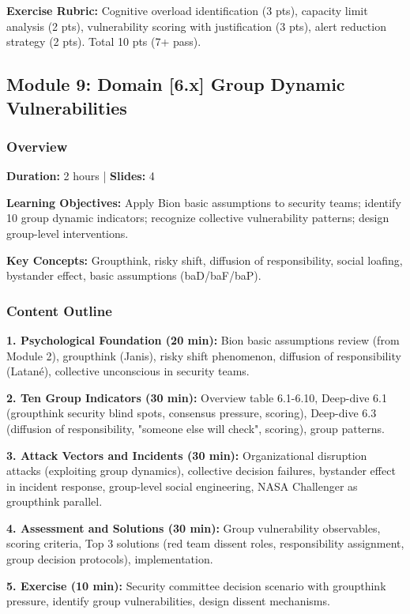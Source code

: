 \documentclass[11pt,a4paper]{article}
\begin{document}
\textbf{Exercise Rubric:} Cognitive overload identification (3 pts), capacity limit analysis (2 pts), vulnerability scoring with justification (3 pts), alert reduction strategy (2 pts). Total 10 pts (7+ pass).

\subsection{Module 9: Domain [6.x] Group Dynamic Vulnerabilities}

\subsubsection{Overview}
\textbf{Duration:} 2 hours | \textbf{Slides:} 4

\textbf{Learning Objectives:} Apply Bion basic assumptions to security teams; identify 10 group dynamic indicators; recognize collective vulnerability patterns; design group-level interventions.

\textbf{Key Concepts:} Groupthink, risky shift, diffusion of responsibility, social loafing, bystander effect, basic assumptions (baD/baF/baP).

\subsubsection{Content Outline}
\textbf{1. Psychological Foundation (20 min):} Bion basic assumptions review (from Module 2), groupthink (Janis), risky shift phenomenon, diffusion of responsibility (Latané), collective unconscious in security teams.

\textbf{2. Ten Group Indicators (30 min):} Overview table 6.1-6.10, Deep-dive 6.1 (groupthink security blind spots, consensus pressure, scoring), Deep-dive 6.3 (diffusion of responsibility, "someone else will check", scoring), group patterns.

\textbf{3. Attack Vectors and Incidents (30 min):} Organizational disruption attacks (exploiting group dynamics), collective decision failures, bystander effect in incident response, group-level social engineering, NASA Challenger as groupthink parallel.

\textbf{4. Assessment and Solutions (30 min):} Group vulnerability observables, scoring criteria, Top 3 solutions (red team dissent roles, responsibility assignment, group decision protocols), implementation.

\textbf{5. Exercise (10 min):} Security committee decision scenario with groupthink pressure, identify group vulnerabilities, design dissent mechanisms.
\end{document}
